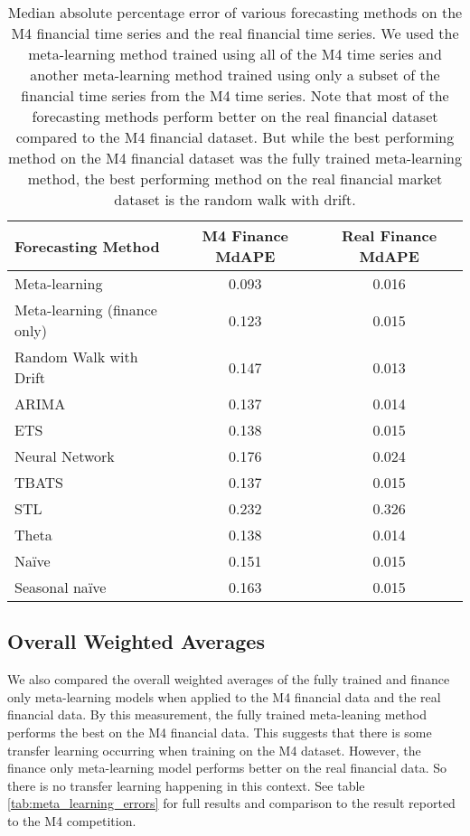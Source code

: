 \documentclass[a4paper,12pt]{article}
\theoremstyle{definition}
\begin{document}
\begin{table}
  \centering
  \begin{tabular}{| l | c | c |}
    \hline
    \textbf{Forecasting Method} & \textbf{M4 Finance MdAPE} & \textbf{Real Finance MdAPE} \\ \hline
    Meta-learning & 0.093 & 0.016 \\ \hline
    Meta-learning (finance only) & 0.123 & 0.015 \\ \hline
    Random Walk with Drift & 0.147 & 0.013 \\ \hline
    ARIMA & 0.137 & 0.014 \\ \hline
    ETS & 0.138 & 0.015 \\ \hline
    Neural Network & 0.176 & 0.024 \\ \hline
    TBATS & 0.137 & 0.015 \\ \hline
    STL & 0.232 & 0.326 \\ \hline
    Theta & 0.138 & 0.014 \\ \hline
    Na{\"i}ve & 0.151 & 0.015 \\ \hline
    Seasonal na{\"i}ve & 0.163 & 0.015 \\ \hline
  \end{tabular}
  \caption{Median absolute percentage error of various forecasting methods on the M4 financial time series and the real financial time series. We used the meta-learning method trained using all of the M4 time series and another meta-learning method trained using only a subset of the financial time series from the M4 time series. Note that most of the forecasting methods perform better on the real financial dataset compared to the M4 financial dataset. But while the best performing method on the M4 financial dataset was the fully trained meta-learning method, the best performing method on the real financial market dataset is the random walk with drift.}
  \label{tab:finance_only_results}
\end{table}

\subsection{Overall Weighted Averages}
We also compared the overall weighted averages of the fully trained and finance only meta-learning models when applied to the M4 financial data and the real financial data. By this measurement, the fully trained meta-leaning method performs the best on the M4 financial data. This suggests that there is some transfer learning occurring when training on the M4 dataset. However, the finance only meta-learning model performs better on the real financial data. So there is no transfer learning happening in this context. See table \ref{tab:meta_learning_errors} for full results and comparison to the result reported to the M4 competition.
\end{document}
